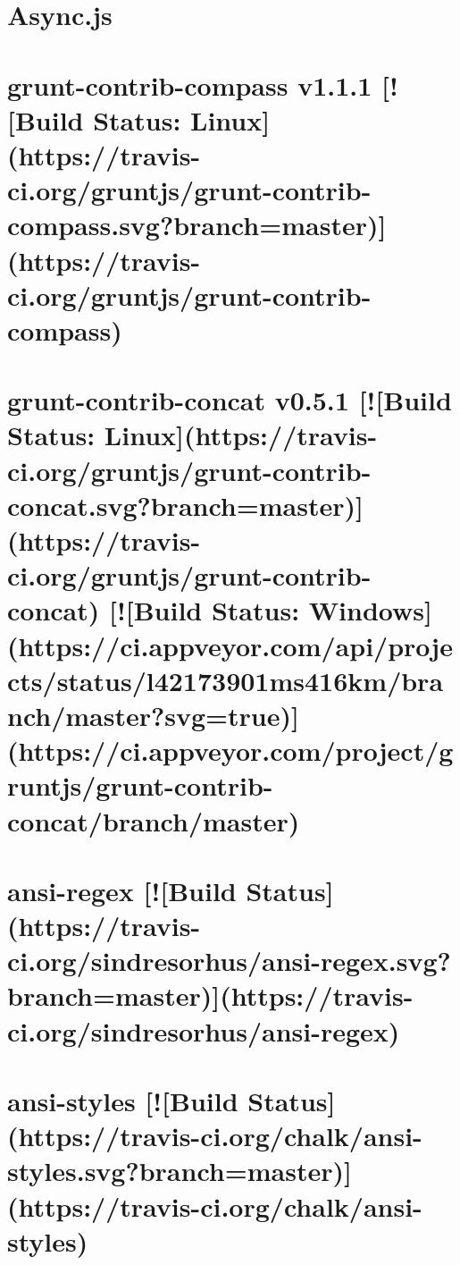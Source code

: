 \documentclass[twoside]{book}
\newcommand{\+}{\discretionary{\mbox{\scriptsize$\hookleftarrow$}}{}{}}
\begin{document}
\chapter{Async.\+js}
\label{md_app_web_node_modules_grunt-contrib-compass_node_modules_async__r_e_a_d_m_e}

\chapter{grunt-\/contrib-\/compass v1.1.1 \mbox{[}!\mbox{[}Build Status\+: Linux\mbox{]}(https\+://travis-\/ci.org/gruntjs/grunt-\/contrib-\/compass.svg?branch=master)\mbox{]}(https\+://travis-\/ci.org/gruntjs/grunt-\/contrib-\/compass)}
\label{md_app_web_node_modules_grunt-contrib-compass__r_e_a_d_m_e}

\chapter{grunt-\/contrib-\/concat v0.5.1 \mbox{[}!\mbox{[}Build Status\+: Linux\mbox{]}(https\+://travis-\/ci.org/gruntjs/grunt-\/contrib-\/concat.svg?branch=master)\mbox{]}(https\+://travis-\/ci.org/gruntjs/grunt-\/contrib-\/concat) \mbox{[}!\mbox{[}Build Status\+: Windows\mbox{]}(https\+://ci.appveyor.\+com/api/projects/status/l42173901ms416km/branch/master?svg=true)\mbox{]}(https\+://ci.appveyor.\+com/project/gruntjs/grunt-\/contrib-\/concat/branch/master)}
\label{md_app_web_node_modules_grunt-contrib-concat__r_e_a_d_m_e}

\chapter{ansi-\/regex \mbox{[}!\mbox{[}Build Status\mbox{]}(https\+://travis-\/ci.org/sindresorhus/ansi-\/regex.svg?branch=master)\mbox{]}(https\+://travis-\/ci.org/sindresorhus/ansi-\/regex)}
\label{md_app_web_node_modules_grunt-contrib-copy_node_modules_ansi-regex_readme}

\chapter{ansi-\/styles \mbox{[}!\mbox{[}Build Status\mbox{]}(https\+://travis-\/ci.org/chalk/ansi-\/styles.svg?branch=master)\mbox{]}(https\+://travis-\/ci.org/chalk/ansi-\/styles)}
\label{md_app_web_node_modules_grunt-contrib-copy_node_modules_ansi-styles_readme}

\end{document}
